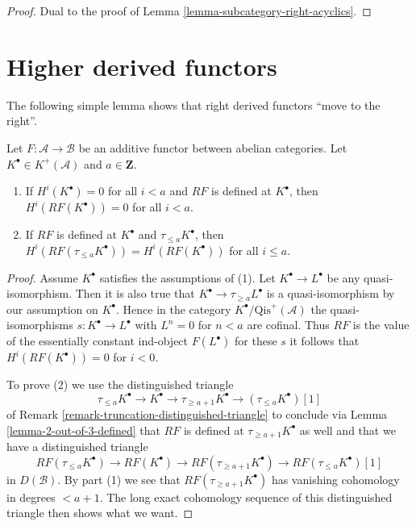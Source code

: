 \begin{proof}
Dual to the proof of
Lemma \ref{lemma-subcategory-right-acyclics}.
\end{proof}







\section{Higher derived functors}
\label{section-higher-derived}

\noindent
The following simple lemma shows that right derived functors
``move to the right''.

\begin{lemma}
\label{lemma-negative-vanishing}
Let $F : \mathcal{A} \to \mathcal{B}$ be an additive functor
between abelian categories. Let $K^\bullet \in K^{+}(\mathcal{A})$
and $a \in \mathbf{Z}$.
\begin{enumerate}
\item If $H^i(K^\bullet) = 0$ for all $i < a$ and $RF$ is defined at
$K^\bullet$, then $H^i(RF(K^\bullet)) = 0$ for all $i < a$.
\item If $RF$ is defined at $K^\bullet$ and $\tau_{\leq a}K^\bullet$,
then $H^i(RF(\tau_{\leq a}K^\bullet)) = H^i(RF(K^\bullet))$
for all $i \leq a$.
\end{enumerate}
\end{lemma}

\begin{proof}
Assume $K^\bullet$ satisfies the assumptions of (1).
Let $K^\bullet \to L^\bullet$ be any quasi-isomorphism.
Then it is also true that $K^\bullet \to \tau_{\geq a}L^\bullet$
is a quasi-isomorphism by our assumption on $K^\bullet$.
Hence in the category $K^\bullet/\text{Qis}^{+}(\mathcal{A})$ the
quasi-isomorphisms $s : K^\bullet \to L^\bullet$ with $L^n = 0$ for $n < a$
are cofinal. Thus $RF$ is the value of the essentially constant
ind-object $F(L^\bullet)$ for these $s$ it follows that
$H^i(RF(K^\bullet)) = 0$ for $i < 0$.

\medskip\noindent
To prove (2) we use the distinguished triangle
$$
\tau_{\leq a}K^\bullet \to K^\bullet \to \tau_{\geq a + 1}K^\bullet
\to (\tau_{\leq a}K^\bullet)[1]
$$
of Remark \ref{remark-truncation-distinguished-triangle} to conclude
via Lemma \ref{lemma-2-out-of-3-defined} that
$RF$ is defined at $\tau_{\geq a + 1}K^\bullet$ as well and that we have
a distinguished triangle
$$
RF(\tau_{\leq a}K^\bullet) \to RF(K^\bullet) \to RF(\tau_{\geq a + 1}K^\bullet)
\to RF(\tau_{\leq a}K^\bullet)[1]
$$
in $D(\mathcal{B})$. By part (1) we see that $RF(\tau_{\geq a + 1}K^\bullet)$
has vanishing cohomology in degrees $< a + 1$. The long exact cohomology
sequence of this distinguished triangle then shows what we want.
\end{proof}

